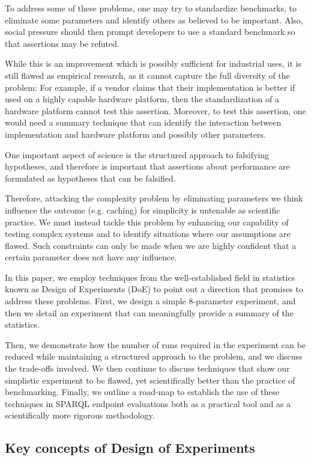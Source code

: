 \documentclass{llncs}
\begin{document}
To address some of these problems, one may try to standardize
benchmarks, to eliminate some parameters and identify others as
believed to be important. Also, social pressure should then prompt
developers to use a standard benchmark so that assertions may be
refuted.

While this is an improvement which is possibly sufficient for
industrial uses, it is still flawed as empirical research, as it
cannot capture the full diversity of the problem: For example, if a
vendor claims that their implementation is better if used on a highly
capable hardware platform, then the standardization of a hardware
platform cannot test this assertion. Moreover, to test this assertion,
one would need a summary technique that can identify the interaction
between implementation and hardware platform and possibly other
parameters.

One important aspect of science is the structured approach to falsifying
hypotheses, and therefore is important that assertions about performance
are formulated as hypotheses that can be falsified.

Therefore, attacking the complexity problem by eliminating parameters we
think influence the outcome (e.g. caching) for simplicity is untenable
as scientific practice. We must instead tackle this problem by
enhancing our capability of testing complex systems and to identify
situations where our assumptions are flawed. Such constraints can only
be made when we are highly confident that a certain parameter does not
have any influence.

In this paper, we employ techniques from the well-established field in
statistics known as Design of Experiments (DoE) to point out a
direction that promises to address these problems. First, we design a
simple 8-parameter experiment, and then we detail an experiment that
can meaningfully provide a summary of the statistics.

Then, we demonstrate how the number of runs required in the experiment
can be reduced while maintaining a structured approach to the problem,
and we discuss the trade-offs involved. We then continue to discuss
techniques that show our simplistic experiment to be flawed, yet
scientifically better than the practice of benchmarking. Finally, we
outline a road-map to establish the use of these techniques in SPARQL
endpoint evaluations both as a practical tool and as a scientifically
more rigorous methodology.

\subsection{Key concepts of Design of Experiments}
\end{document}
